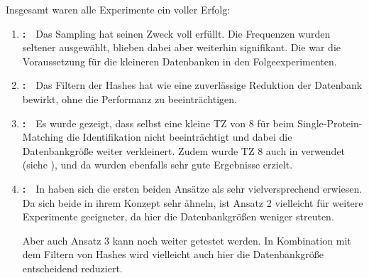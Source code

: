    Insgesamt waren alle \NumWord{\theexperiment} Experimente ein voller Erfolg:
    \begin{enumerate}
        \item \textbf{:}\ \ Das Sampling hat seinen Zweck voll erfüllt. Die Frequenzen wurden seltener ausgewählt, blieben dabei aber weiterhin signifikant. Die war die Voraussetzung für die kleineren Datenbanken in den Folgeexperimenten.

        \item \textbf{:}\ \ Das Filtern der Hashes hat wie  eine zuverlässige Reduktion der Datenbank bewirkt, ohne die Performanz zu beeinträchtigen.

        \item \textbf{:}\ \ Es wurde gezeigt, dass selbst eine kleine \ac{TZ} von 8 für beim Single-Protein-Matching die Identifikation nicht beeinträchtigt und dabei die Datenbankgröße weiter verkleinert. Zudem wurde \ac{TZ} 8 auch in  verwendet (siehe ), und da wurden ebenfalls sehr gute Ergebnisse erzielt.

        \item \textbf{:}\ \ In  haben sich die ersten beiden Ansätze als sehr vielversprechend erwiesen. Da sich beide in ihrem Konzept sehr ähneln, ist Ansatz 2 vielleicht für weitere Experimente geeigneter, da hier die Datenbankgrößen weniger streuten.

        Aber auch Ansatz 3 kann noch weiter getestet werden. In Kombination mit dem Filtern von Hashes wird vielleicht auch hier die Datenbankgröße entscheidend reduziert.
    \end{enumerate}

